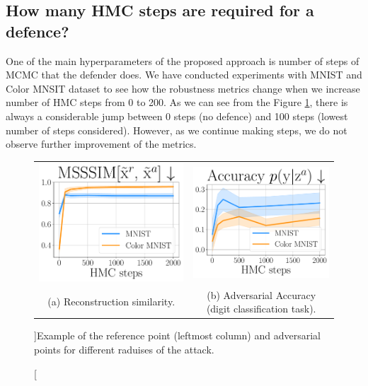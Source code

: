 \newpage

\subsection{How many HMC steps are required for a defence?}\label{appendix:hmc_steps}
One of the main hyperparameters of the proposed approach is number of steps of MCMC that the defender does. We have conducted experiments with MNIST and Color MNSIT dataset to see how the robustness metrics change when we increase number of HMC steps from 0 to 200. As we can see from the Figure \ref{fig:hmc_step_metrics}, there is always a considerable jump between 0 steps (no defence) and 100 steps (lowest number of steps considered). However, as we continue making steps, we do not observe further improvement of the metrics. 
\begin{figure}[ht]
    \centering
    \begin{tabular}{cc}
        \includegraphics[width=0.4\columnwidth]{pics/3_adv_att/hmc_steps_ref_rec_sim.pdf} &
        \includegraphics[width=0.4\columnwidth]{pics/3_adv_att/hmc_steps_adv_acc.pdf} \\
        \multirow{2}{0.4\columnwidth}{\centering \small (a) Reconstruction similarity.} &
        \multirow{2}{0.4\columnwidth}{\centering \small (b) Adversarial Accuracy (digit classification task). } 
        \\
        \\
    \end{tabular}
    \caption[][\baselineskip]{Example of the reference point (leftmost column) and adversarial points for different raduises of the attack.}
    \label{fig:hmc_step_metrics}
\end{figure}
\newpage

